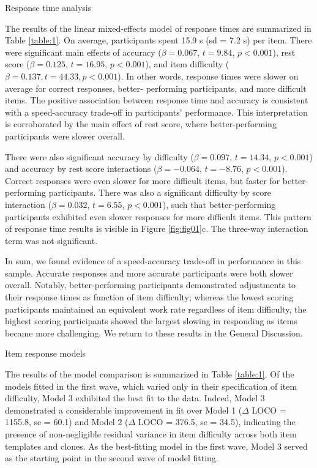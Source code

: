\documentclass[a4paper,man,natbib]{apa6}
\makeatletter
\renewcommand{\subsubsection}{\@startsection{subsubsection}{3}
  {\z@}%
  {\b@level@two@skip}{\e@level@two@skip}%
  {\normalfont\normalsize\bfseries}}
\makeatother
\begin{document}
\subsubsection{Response time analysis}

The results of the linear mixed-effects model of response times are summarized in Table \ref{table:1}. On average, participants spent 15.9 s (sd = 7.2 s) per item. There were significant main effects of accuracy ($\beta = 0.067$, $t = 9.84$, $p < 0.001$), rest score ($\beta = 0.125$, $t = 16.95$, $p < 0.001$), and item difficulty ($\beta = 0.137, t = 44.33, p < 0.001$). In other words, response times were slower on average for correct responses, better- performing participants, and more difficult items. The positive association between response time and accuracy is consistent with a speed-accuracy trade-off in participants' performance. This interpretation is corroborated by the main effect of rest score, where better-performing participants were slower overall. 

There were also significant accuracy by difficulty ($\beta = 0.097$, $t = 14.34$, $p < 0.001$) and accuracy by rest score interactions ($\beta = -0.064$, $t = -8.76$, $p < 0.001$). Correct responses were even slower for more difficult items, but faster for better-performing participants. There was also a significant difficulty by score interaction ($\beta = 0.032$, $t = 6.55$, $p < 0.001$), such that better-performing participants exhibited even slower responses for more difficult items. This pattern of response time results is visible in Figure \ref{fig:fig01}c. The three-way interaction term was not significant. 

In sum, we found evidence of a speed-accuracy trade-off in performance in this sample. Accurate responses and more accurate participants were both slower overall. Notably, better-performing participants demonstrated adjustments to their response times as function of item difficulty; whereas the lowest scoring participants maintained an equivalent work rate regardless of item difficulty, the highest scoring participants showed the largest slowing in responding as items became more challenging. We return to these results in the General Discussion. 

\subsubsection{Item response models}

The results of the model comparison is summarized in Table \ref{table:1}. Of the models fitted in the first wave, which varied only in their specification of item difficulty, Model 3 exhibited the best fit to the data. Indeed, Model 3 demonstrated a considerable improvement in fit over Model 1 ($\Delta$ LOCO = 1155.8, se = 60.1) and Model 2 ($\Delta$ LOCO = 376.5, se = 34.5), indicating the presence of non-negligible residual variance in item difficulty across both item templates and clones. As the best-fitting model in the first wave, Model 3 served as the starting point in the second wave of model fitting.
\end{document}
